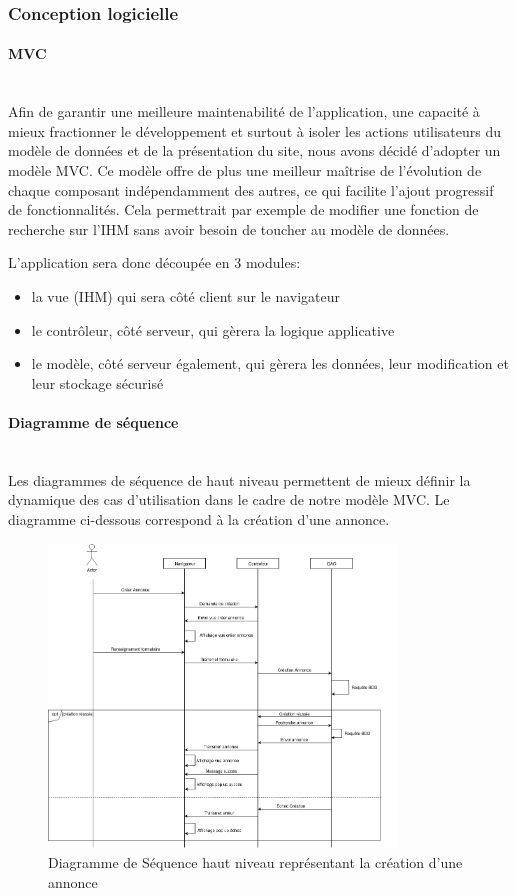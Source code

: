 \documentclass[a4paper,11pt]{article}
\begin{document}
\subsubsection{Conception logicielle}
\paragraph{MVC}\mbox{} \\

Afin de garantir une meilleure maintenabilité de l'application, une capacité à mieux fractionner le développement
et surtout à isoler les actions utilisateurs du modèle de données et de la présentation du site, nous avons décidé
d'adopter un modèle MVC. Ce modèle offre de plus une meilleur maîtrise de l'évolution de chaque composant
indépendamment des autres, ce qui facilite l'ajout progressif de fonctionnalités. Cela permettrait par exemple de modifier
une fonction de recherche sur l'IHM sans avoir besoin de toucher au modèle de données.

L'application sera donc découpée en 3 modules:
\begin{itemize}
  \item la vue (IHM) qui sera côté client sur le navigateur
  \item le contrôleur, côté serveur, qui gèrera la logique applicative
  \item le modèle, côté serveur également, qui gèrera les données, leur modification et leur stockage sécurisé
\end{itemize}

\paragraph{Diagramme de séquence}\mbox{} \\
Les diagrammes de séquence de haut niveau permettent de mieux définir la dynamique des cas d'utilisation dans le cadre de notre modèle MVC. Le diagramme ci-dessous correspond à la création d'une annonce. \\

\begin{figure}[H]
  \includegraphics[width=350px]{../Conception/DS_annonce.png}
  \caption{Diagramme de Séquence haut niveau représentant la création d'une annonce}
  \label{fig:<un-label-court>}
\end{figure}
\end{document}
